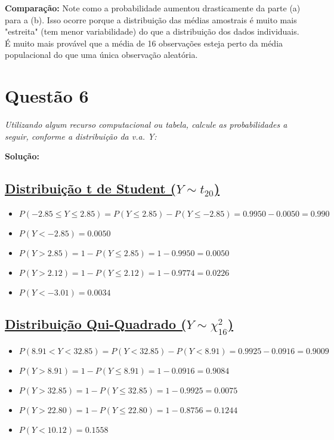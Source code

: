 \documentclass[12pt, a4paper]{article}
\begin{document}
\textbf{Comparação:} Note como a probabilidade aumentou drasticamente da parte (a) para a (b). Isso ocorre porque a distribuição das médias amostrais é muito mais "estreita" (tem menor variabilidade) do que a distribuição dos dados individuais. É muito mais provável que a média de 16 observações esteja perto da média populacional do que uma única observação aleatória.

\section*{Questão 6}
\textit{Utilizando algum recurso computacional ou tabela, calcule as probabilidades a seguir, conforme a distribuição da v.a. Y:}

\textbf{Solução:}
\vspace{0.5cm}

\subsection*{\underline{Distribuição t de Student ($Y \sim t_{20}$)}}
\begin{itemize}
    \item $P(-2.85 \le Y \le 2.85) = P(Y \le 2.85) - P(Y \le -2.85) = 0.9950 - 0.0050 = \mathbf{0.990}$
    \item $P(Y < -2.85) = \mathbf{0.0050}$
    \item $P(Y > 2.85) = 1 - P(Y \le 2.85) = 1 - 0.9950 = \mathbf{0.0050}$
    \item $P(Y > 2.12) = 1 - P(Y \le 2.12) = 1 - 0.9774 = \mathbf{0.0226}$
    \item $P(Y < -3.01) = \mathbf{0.0034}$
\end{itemize}
\vspace{0.5cm}

\subsection*{\underline{Distribuição Qui-Quadrado ($Y \sim \chi^2_{16}$)}}
\begin{itemize}
    \item $P(8.91 < Y < 32.85) = P(Y < 32.85) - P(Y < 8.91) = 0.9925 - 0.0916 = \mathbf{0.9009}$
    \item $P(Y > 8.91) = 1 - P(Y \le 8.91) = 1 - 0.0916 = \mathbf{0.9084}$
    \item $P(Y > 32.85) = 1 - P(Y \le 32.85) = 1 - 0.9925 = \mathbf{0.0075}$
    \item $P(Y > 22.80) = 1 - P(Y \le 22.80) = 1 - 0.8756 = \mathbf{0.1244}$
    \item $P(Y < 10.12) = \mathbf{0.1558}$
\end{itemize}
\vspace{0.5cm}
\end{document}
